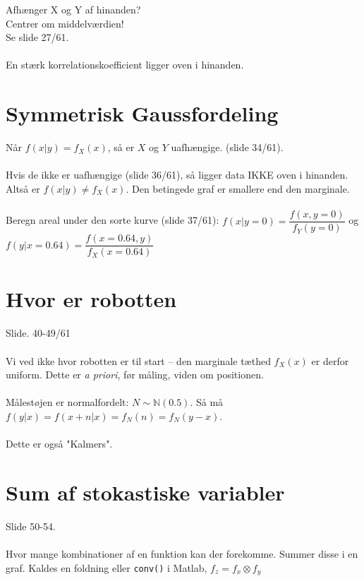 \documentclass[Main]{subfiles}
\begin{document}
Afhænger X og Y af hinanden?\\
Centrer om middelværdien!
\\
Se slide 27/61.
\\
\\
En stærk korrelationskoefficient ligger oven i hinanden.

\section{Symmetrisk Gaussfordeling}

Når $f(x|y) = f_X(x)$, så er $X$ og $Y$ uafhængige. (slide 34/61).
\\\\
Hvis de ikke er uafhængige (slide 36/61), så ligger data IKKE oven i hinanden.
Altså er $f(x|y) \not = f_X(x)$.
Den betingede graf er smallere end den marginale.
\\
\\
Beregn areal under den sorte kurve (slide 37/61): $f(x|y=0) = \dfrac{f(x,y=0)}{f_Y(y=0)}$ og $f(y|x=0.64) = \dfrac{f(x=0.64, y)}{f_X(x=0.64)}$






\section{Hvor er robotten}
Slide. 40-49/61
\\
\\
Vi ved ikke hvor robotten er til start -- den marginale tæthed $f_X(x)$ er derfor uniform.
Dette er \textit{a priori}, før måling, viden om positionen.
\\
\\
Målestøjen er normalfordelt: $ N \sim \mathbb{N}(0.5)$.
Så må $f(y|x) = f(x+n|x) = f_N(n) = f_N(y-x)$.
\\
\\
Dette er også "Kalmers".


\section{Sum af stokastiske variabler}
Slide 50-54.
\\
\\
Hvor mange kombinationer af en funktion kan der forekomme. Summer disse i en graf.
Kaldes en foldning eller \texttt{conv()} i Matlab, $ f_z = f_x \otimes f_y$
\end{document}
